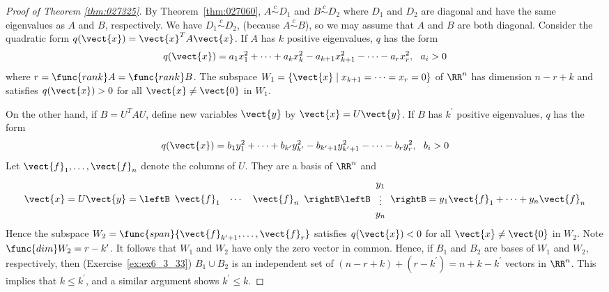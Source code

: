\newpage
\begin{proof}[Proof of Theorem \ref{thm:027325}]

\noindent By Theorem~\ref{thm:027060}, $A \stackrel{c}{\sim} D_{1}$ and $B \stackrel{c}{\sim} D_{2}$ where $D_{1}$ and $D_{2}$ are diagonal and have the same eigenvalues as $A$ and $B$, respectively. We have $D_{1} \stackrel{c}{\sim} D_{2}$, (because $A \stackrel{c}{\sim} B$), so we may assume that $A$ and $B$ are both diagonal. Consider the quadratic form $q(\vect{x}) = \vect{x}^{T}A\vect{x}$. If $A$ has $k$ positive eigenvalues, $q$ has the form
\begin{equation*}
q(\vect{x}) = a_{1}x_{1}^2 + \cdots + a_{k}x_{k}^2 - a_{k+1}x_{k+1}^2 - \cdots - a_{r}x_{r}^2, \ \ a_{i} > 0
\end{equation*}
where $r = \func{rank }A = \func{rank }B$. The subspace $W_{1} = \{\vect{x} \mid x_{k + 1} = \cdots = x_{r} = 0\}$ of $\RR^n$ has dimension $n - r + k$ and satisfies $q(\vect{x}) > 0$ for all $\vect{x} \neq \vect{0}$ in $W_{1}$.

On the other hand, if $B = U^{T}AU$, define new variables $\vect{y}$ by $\vect{x} = U\vect{y}$. If $B$ has $k^\prime$ positive eigenvalues, $q$ has the form
\begin{equation*}
q(\vect{x}) = b_{1}y_{1}^2 + \cdots + b_{k^\prime}y_{k^\prime}^2 - b_{k^\prime+1}y_{k^\prime+1}^2 - \cdots - b_{r}y_{r}^2, \ \ b_{i} > 0
\end{equation*}
Let $\vect{f}_{1}, \dots, \vect{f}_{n}$ denote the columns of $U$. They are a basis of $\RR^n$ and
\begin{equation*}
\vect{x} = U\vect{y} = \leftB \begin{array}{ccc}
\vect{f}_{1} & \cdots & \vect{f}_{n}
\end{array}\rightB \leftB \begin{array}{c}
y_{1} \\
\vdots \\
y_{n}
\end{array}\rightB = y_{1}\vect{f}_{1} + \cdots + y_{n}\vect{f}_{n}
\end{equation*}
Hence the subspace $W_{2} = \func{span}\{\vect{f}_{k^{\prime}+1}, \dots, \vect{f}_{r}\}$ satisfies $q(\vect{x}) < 0$ for all $\vect{x} \neq \vect{0}$ in $W_{2}$. Note $\func{dim }W_{2} = r - k^{\prime}$. It follows that $W_{1}$ and $W_{2}$ have only the zero vector in common. Hence, if $B_{1}$ and $B_{2}$ are bases of $W_{1}$ and $W_{2}$, respectively, then (Exercise~\ref{ex:ex6_3_33}) $B_{1} \cup B_{2}$ is an independent set of $(n - r + k) + (r - k^{\prime}) = n + k - k^{\prime}$ vectors in $\RR^n$. This implies that $k \leq k^{\prime}$, and a similar argument shows $k^{\prime} \leq k$.
\end{proof}
